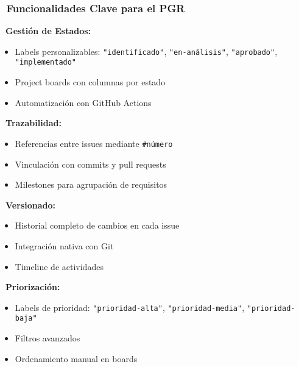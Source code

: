 \documentclass[12pt,a4paper]{article}
\begin{document}
\subsubsection{\faCogs\ Funcionalidades Clave para el PGR}

\begin{tcolorbox}[colback=white, colframe=headercolor, rounded corners, boxrule=1pt]

\textbf{\faTag\ Gestión de Estados:}
\begin{itemize}[itemsep=0.2em]
    \item Labels personalizables: \texttt{"identificado"}, \texttt{"en-análisis"}, \texttt{"aprobado"}, \texttt{"implementado"}
    \item Project boards con columnas por estado
    \item \textcolor{headercolor}{\faRobot} Automatización con GitHub Actions
\end{itemize}

\textbf{\faProjectDiagram\ Trazabilidad:}
\begin{itemize}[itemsep=0.2em]
    \item Referencias entre issues mediante \texttt{\#número}
    \item Vinculación con commits y pull requests
    \item \textcolor{headercolor}{\faBullseye} Milestones para agrupación de requisitos
\end{itemize}

\textbf{\faCodeBranch\ Versionado:}
\begin{itemize}[itemsep=0.2em]
    \item Historial completo de cambios en cada issue
    \item Integración nativa con Git
    \item \textcolor{headercolor}{\faClock} Timeline de actividades
\end{itemize}

\textbf{\faStar\ Priorización:}
\begin{itemize}[itemsep=0.2em]
    \item Labels de prioridad: \texttt{"prioridad-alta"}, \texttt{"prioridad-media"}, \texttt{"prioridad-baja"}
    \item Filtros avanzados
    \item \textcolor{headercolor}{\faSort} Ordenamiento manual en boards
\end{itemize}

\end{tcolorbox}
\end{document}
